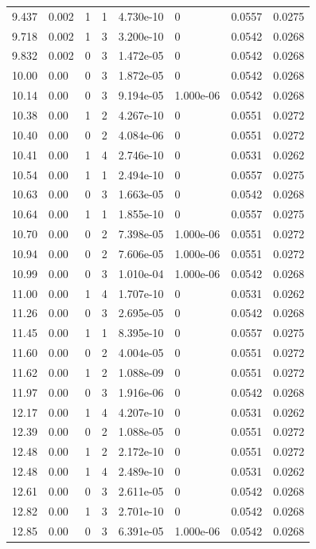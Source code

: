 \documentclass[preview]{standalone}
\begin{document}
{{{\begin{tabular}{L{1.2cm}C{1.2cm} C{0.3cm}C{0.5cm} C{1.4cm}C{1.4cm} C{1.4cm}C{1.4cm}}
  9.437  &  0.002  & 1     &  1 &  4.730e-10  & 0  & 0.0557 &  0.0275   \\ 
  9.718  &  0.002  & 1     &  3 &  3.200e-10  & 0  & 0.0542 &  0.0268   \\ 
  9.832  &  0.002  & 0     &  3 &  1.472e-05  & 0  & 0.0542 &  0.0268   \\ 
  10.00  &  0.00  & 0     &  3 &  1.872e-05  & 0  & 0.0542 &  0.0268   \\ 
  10.14  &  0.00  & 0     &  3 &  9.194e-05  & 1.000e-06  & 0.0542 &  0.0268   \\ 
  10.38  &  0.00  & 1     &  2 &  4.267e-10  & 0  & 0.0551 &  0.0272   \\ 
  10.40  &  0.00  & 0     &  2 &  4.084e-06  & 0  & 0.0551 &  0.0272   \\ 
  10.41  &  0.00  & 1     &  4 &  2.746e-10  & 0  & 0.0531 &  0.0262   \\ 
  10.54  &  0.00  & 1     &  1 &  2.494e-10  & 0  & 0.0557 &  0.0275   \\ 
  10.63  &  0.00  & 0     &  3 &  1.663e-05  & 0  & 0.0542 &  0.0268   \\ 
  10.64  &  0.00  & 1     &  1 &  1.855e-10  & 0  & 0.0557 &  0.0275   \\ 
  10.70  &  0.00  & 0     &  2 &  7.398e-05  & 1.000e-06  & 0.0551 &  0.0272   \\ 
  10.94  &  0.00  & 0     &  2 &  7.606e-05  & 1.000e-06  & 0.0551 &  0.0272   \\ 
  10.99  &  0.00  & 0     &  3 &  1.010e-04  & 1.000e-06  & 0.0542 &  0.0268   \\ 
  11.00  &  0.00  & 1     &  4 &  1.707e-10  & 0  & 0.0531 &  0.0262   \\ 
  11.26  &  0.00  & 0     &  3 &  2.695e-05  & 0  & 0.0542 &  0.0268   \\ 
  11.45  &  0.00  & 1     &  1 &  8.395e-10  & 0  & 0.0557 &  0.0275   \\ 
  11.60  &  0.00  & 0     &  2 &  4.004e-05  & 0  & 0.0551 &  0.0272   \\ 
  11.62  &  0.00  & 1     &  2 &  1.088e-09  & 0  & 0.0551 &  0.0272   \\ 
  11.97  &  0.00  & 0     &  3 &  1.916e-06  & 0  & 0.0542 &  0.0268   \\ 
  12.17  &  0.00  & 1     &  4 &  4.207e-10  & 0  & 0.0531 &  0.0262   \\ 
  12.39  &  0.00  & 0     &  2 &  1.088e-05  & 0  & 0.0551 &  0.0272   \\ 
  12.48  &  0.00  & 1     &  2 &  2.172e-10  & 0  & 0.0551 &  0.0272   \\ 
  12.48  &  0.00  & 1     &  4 &  2.489e-10  & 0  & 0.0531 &  0.0262   \\ 
  12.61  &  0.00  & 0     &  3 &  2.611e-05  & 0  & 0.0542 &  0.0268   \\ 
  12.82  &  0.00  & 1     &  3 &  2.701e-10  & 0  & 0.0542 &  0.0268   \\ 
  12.85  &  0.00  & 0     &  3 &  6.391e-05  & 1.000e-06  & 0.0542 &  0.0268   \\ 
\hline 
\end{tabular} 

}}}
\end{document}
